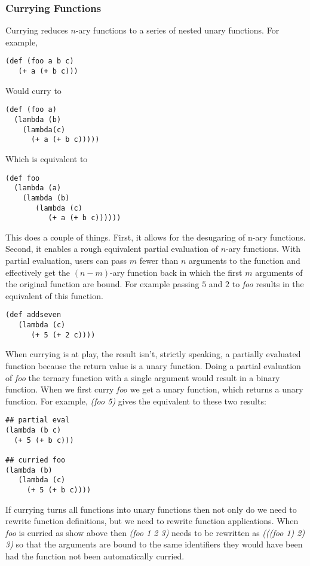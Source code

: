 \documentclass[10pt]{article}
\begin{document}
\subsubsection*{Currying Functions}

Currying reduces $n$-ary functions to a series of nested unary functions. For example, 
\begin{verbatim}
(def (foo a b c)
   (+ a (+ b c)))
\end{verbatim}
Would curry to
\begin{verbatim}
(def (foo a)
  (lambda (b)
    (lambda(c)
      (+ a (+ b c)))))
\end{verbatim}
Which is equivalent to
\begin{verbatim}
(def foo 
  (lambda (a)
    (lambda (b) 
       (lambda (c)
          (+ a (+ b c))))))
\end{verbatim}
This does a couple of things. First, it allows for the desugaring of n-ary functions. Second, it enables a rough equivalent partial evaluation of $n$-ary functions. With partial evaluation, users can pass $m$ fewer than $n$ arguments to the function and effectively get the $(n-m)$-ary function back in which the first $m$ arguments of the original function are bound. For example passing $5$ and $2$ to \textit{foo} results in the equivalent of this function.
\begin{verbatim}
(def addseven
   (lambda (c)
      (+ 5 (+ 2 c))))
\end{verbatim}
When currying is at play, the result isn't, strictly speaking, a partially evaluated function because the return value is a unary function. Doing a partial evaluation of \textit{foo} the ternary function with a single argument would result in a binary function. When we first curry \textit{foo} we get a unary function, which returns a unary function. For example, \textit{(foo 5)} gives the equivalent to these two results: 
\begin{verbatim}
## partial eval
(lambda (b c)
  (+ 5 (+ b c)))
  
## curried foo
(lambda (b)
   (lambda (c)
     (+ 5 (+ b c))))
\end{verbatim}

If currying turns all functions into unary functions then not only do we need to rewrite function definitions, but we need to rewrite function applications. When \textit{foo} is curried as show above then \textit{(foo 1 2 3)} needs to be rewritten as \textit{(((foo 1) 2) 3)} so that the arguments are bound to the same identifiers they would have been had the function not been automatically curried.
\end{document}
